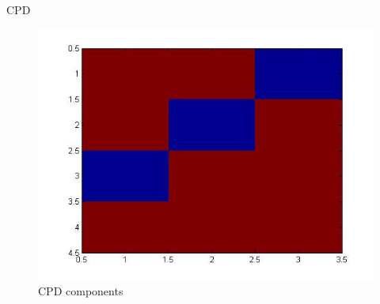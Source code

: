 \documentclass[t,12pt,english
\ifx\beamermode\undefined\else,\beamermode\fi
]{beamer}
\begin{document}
\begin{frame}{CPD}
\begin{figure}[!htbp]
\includegraphics[width=1\textwidth]{13.jpg}
\endminipage\hfill
\caption{\tiny CPD components}\label{a15}
\end{figure}
\end{frame}
\end{document}
